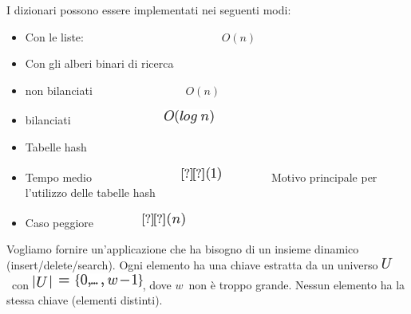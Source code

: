 \documentclass{article}
\providecommand{\tightlist}{%
  \setlength{\itemsep}{0pt}\setlength{\parskip}{0pt}}
\begin{document}
{{}

{I dizionari possono essere implementati nei seguenti modi:}

\begin{itemize}
\tightlist
\item
  {Con le liste:
  ~~~~~~~~~~~~~~~~~~~~~~~~}$O(n)$
\item
  {Con gli alberi binari di ricerca}
\end{itemize}

\begin{itemize}
\tightlist
\item
  {non bilanciati ~~~~~~~~~~~~~~~~}$O(n)$
\item
  {bilanciati ~~~~~~~~~~~~~~~~}\includegraphics{images/image220.png}
\end{itemize}

\begin{itemize}
\tightlist
\item
  {Tabelle hash}
\end{itemize}

\begin{itemize}
\tightlist
\item
  {Tempo
  medio~~~~~~~~~~~~~~~~}\includegraphics{images/image221.png}{~~~~~~~~~Motivo
  principale per l'utilizzo delle tabelle hash}
\item
  {Caso peggiore ~~~~~~~~}\includegraphics{images/image149.png}
\end{itemize}

{}

{Vogliamo fornire un'applicazione che ha bisogno di un insieme dinamico
(insert/delete/search). Ogni elemento ha una chiave estratta da un
universo }\includegraphics{images/image222.png}{~con
}\includegraphics{images/image223.png}{, dove
}$w${~non è troppo grande. Nessun
elemento ha la stessa chiave (elementi distinti). }

{}

}
\end{document}
